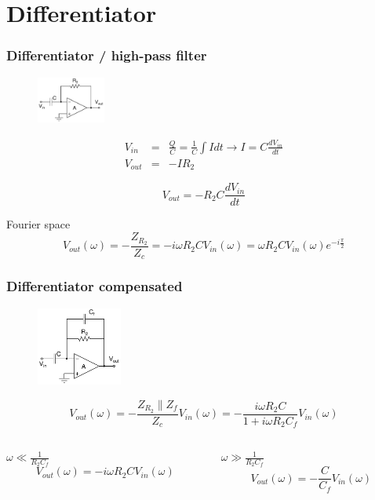 \documentclass[beamer]{standalone}
\begin{document}
\section{Differentiator}
\frame
{ \frametitle{Differentiator / high-pass filter}
\begin{figure}
	\includegraphics[width=0.20\textwidth]{./schematics/differentiator.pdf}
\end{figure}
\begin{eqnarray*}
	V_{in} &=&  \frac{Q}{C}=\frac{1}{C} \int I dt \to I= C \frac{dV_{in}}{dt}
	\\
	V_{out} &=&  - I R_2
\end{eqnarray*}
\begin{block}{}
\[
V_{out} = -R_2 C \frac{dV_{in}}{dt}
\]
\end{block}

\begin{block}{Fourier space}
\[
V_{out}(\omega) = -\frac{Z_{R_2}}{Z_c}= - i \omega R_2 C V_{in}(\omega)=
\omega R_2 C  V_{in}(\omega) e^{-i\frac{\pi}{2}}
\]
\end{block}

	}

\frame
{ \frametitle{Differentiator compensated}
\begin{figure}
	\includegraphics[width=0.25\textwidth]{./schematics/differentiator_compensated.pdf}
\end{figure}

\begin{block}{}
	\[
	V_{out}(\omega) = -\frac{Z_{R_2}\|Z_f}{Z_c}  V_{in}(\omega) =  - \frac{i \omega R_2 C} {1+ i\omega R_2 C_f} V_{in}(\omega)
	\]
\end{block}
\begin{columns}[t]
	\begin{column}{.45\textwidth}
		\begin{block}{$\omega \ll \frac{1}{R_2 C_f}$}
			\[
			V_{out}(\omega) = - {i \omega R_2 C} V_{in}(\omega)
			\]
		\end{block}

	\end{column}
	\begin{column}{.45\textwidth}
		\begin{block}{$\omega \gg \frac{1}{R_2 C_f}$}
			\[
			V_{out}(\omega) = - \frac{C}{C_f} V_{in}(\omega)
			\]
		\end{block}

	\end{column}
\end{columns}


}
\end{document}
